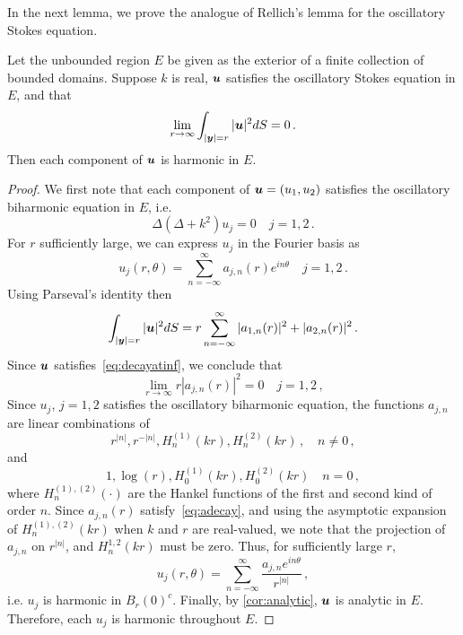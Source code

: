 In the next lemma, we prove the analogue of Rellich's lemma for the
oscillatory Stokes equation. 
\begin{lem}
  \label{lem:rellich}
  Let the unbounded region $E$ be given as the exterior
  of a finite collection of bounded domains.
  Suppose $k$ is real, ${\boldsymbol u}$ satisfies the oscillatory
  Stokes equation in $E$, and that 
\begin{equation}
\lim_{r \to \infty} \int_{|{\boldsymbol y}|=r} |{\boldsymbol u}|^2 dS = 0 
\, . \label{eq:decayatinf}
\end{equation}
Then each component of ${\boldsymbol u}$ is harmonic in $E$.
\end{lem}
\begin{proof}
We first note that each component of ${\boldsymbol u}= (u_{1},u_{2})$ satisfies the 
oscillatory biharmonic equation in $E$, i.e.
\begin{equation}
\Delta (\Delta + k^2) u_{j} = 0 \quad j=1,2 \,. \nonumber
\end{equation}
For $r$ sufficiently large, we can express $u_{j}$ in the Fourier basis as
\begin{equation}
u_{j}(r,\theta) = \sum_{n=-\infty}^{\infty} a_{j,n}(r) e^{i n \theta}  \quad 
j=1,2 \, . \nonumber
\end{equation}
Using Parseval's identity then
\begin{equation}
\int_{|{\boldsymbol y}|=r} |{\boldsymbol u}|^2 dS = r\sum_{n=-\infty}^{\infty} |a_{1,n}(r)|^2  +
|a_{2,n}(r)|^2 \, . \nonumber
\end{equation}
Since ${\boldsymbol u}$ satisfies~\cref{eq:decayatinf}, we conclude that
\begin{equation}
\lim_{r\to\infty} r|a_{j,n}(r)|^2 = 0 \quad j=1,2 \, , \label{eq:adecay}
\end{equation}
Since $u_{j}$, $j=1,2$ satisfies the oscillatory biharmonic equation,
the functions $a_{j,n}$ are linear combinations of 
\begin{equation}
r^{|n|}, r^{-|n|}, H^{(1)}_{n}(k r), H^{(2)}_{n}(k r) \, , \quad
n\neq 0 \, , \nonumber
\end{equation}
and
\begin{equation}
1, \log{(r)}, H^{(1)}_{0}(k r), H^{(2)}_{0}(k r) \quad n=0 \, ,  \nonumber
\end{equation} 
where $H_{n}^{(1),(2)}(\cdot)$ are the Hankel functions of the first and
second kind of order $n$.
Since $a_{j,n}(r)$ satisfy~\cref{eq:adecay}, and using the asymptotic 
expansion of $H_{n}^{(1),(2)}(kr)$ when $k$ and $r$ are real-valued, we note
that the projection of $a_{j,n}$ on $r^{|n|}$, and $H_{n}^{1,2}(k r)$
must be zero. Thus, for sufficiently large $r$,
\begin{equation}
u_{j}(r,\theta) = \sum_{n=-\infty}^{\infty} \frac{a_{j,n} e^{i n \theta}}{r^{|n|}} 
\, , \nonumber
\end{equation}
i.e. $u_{j}$ is harmonic 
in $B_{r}(0)^{c}$.
Finally, by \cref{cor:analytic}, ${\boldsymbol u}$ is
analytic in $E$. Therefore, each $u_j$ is harmonic
throughout $E$.
\end{proof}

